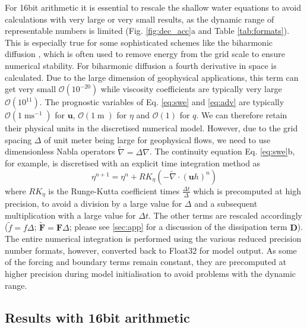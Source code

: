 \documentclass[draft]{agujournal2019}
\newcommand{\op}{\operatorname}
\begin{document}
For 16bit arithmetic it is essential to rescale the shallow water equations to avoid calculations with very large or very small results, as the dynamic range of representable numbers is limited (Fig. \ref{fig:dec_acc}a and Table \ref{tab:formats}). This is especially true for some sophisticated schemes like the biharmonic diffusion \cite{Griffies2000}, which is often used to remove energy from the grid scale to ensure numerical stability. For biharmonic diffusion a fourth derivative in space is calculated. Due to the large dimension of geophysical applications, this term can get very small $\mathcal{O}(10^{-20})$ while viscosity coefficients are typically very large $\mathcal{O}(10^{11})$. The prognostic variables of Eq. \ref{eq:swe} and \ref{eq:adv} are typically $\mathcal{O}(1\op{ms}^{-1})$ for $\mathbf{u}$, $\mathcal{O}(1\op{m})$ for $\eta$ and $\mathcal{O}(1)$ for $q$. We can therefore retain their physical units in the discretised numerical model. However, due to the grid spacing $\Delta$ of unit meter being large for geophysical flows, we need to use dimensionless Nabla operators $\tilde{\nabla} = \Delta\nabla$. The continuity equation Eq. \ref{eq:swe}b, for example, is discretised with an explicit time integration method as
\begin{equation}
\eta^{n+1} = \eta^n + RK_{\eta}\left( - \tilde{\nabla} \cdot (\mathbf{u}h)^n\right)
\label{eq:discr}
\end{equation}
where $RK_\eta$ is the Runge-Kutta coefficient times $\tfrac{\Delta t}{\Delta}$ which is precomputed at high precision, to avoid a division by a large value for $\Delta$ and a subsequent multiplication with a large value for $\Delta t$. The other terms are rescaled accordingly ($\tilde{f} = f\Delta$; $\tilde{\mathbf{F}} = \mathbf{F}\Delta$; please see \ref{sec:app} for a discussion of the dissipation term $\mathbf{D}$). The entire numerical integration is performed using the various reduced precision number formats, however, converted back to Float32 for model output. As some of the forcing and boundary terms remain constant, they are precomputed at higher precision during model initialisation to avoid problems with the dynamic range.


\subsection{Results with 16bit arithmetic}
\end{document}
